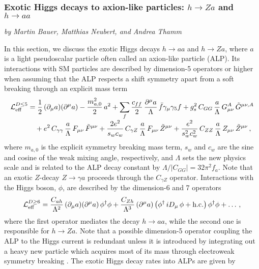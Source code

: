 \subsubsection{Exotic Higgs decays to axion-like particles: $h \to Za$ and $h \to aa$}\label{Sec:9.1.8}
\begin{center}
{\it{ by Martin Bauer, Matthias Neubert, and Andrea Thamm}}
\end{center}


In this section, we discuss the exotic Higgs decays $h\to aa$ and $h\to Za$, where $a$ is a light pseudoscalar particle often called an axion-like particle (ALP). Its interactions with SM particles are described by dimension-5 operators or higher when assuming that the ALP respects a shift symmetry apart from a soft breaking through an explicit mass term \cite{Georgi:1986df} 
%
\begin{equation}\label{Leff}
\begin{aligned}
   {\cal L}_{\rm eff}^{D\le 5}
   &= \frac12 \left( \partial_\mu a\right)\!\left( \partial^\mu a\right)
    - \frac{m_{a,0}^2}{2}\,a^2 
    + \sum_f \frac{c_{ff}}{2}\,\frac{\partial^\mu a}{\Lambda}\,\bar f\gamma_\mu\gamma_5 f  + g_s^2\,C_{GG}\,\frac{a}{\Lambda}\,G_{\mu\nu}^A\,\tilde G^{\mu\nu,A} \\[-1mm]
   &\quad\mbox{}+ e^2\,C_{\gamma\gamma}\,\frac{a}{\Lambda}\,F_{\mu\nu}\,\tilde F^{\mu\nu}
    + \frac{2e^2}{s_w c_w}\,C_{\gamma Z}\,\frac{a}{\Lambda}\,F_{\mu\nu}\,\tilde Z^{\mu\nu}
    + \frac{e^2}{s_w^2 c_w^2}\,C_{ZZ}\,\frac{a}{\Lambda}\,Z_{\mu\nu}\,\tilde Z^{\mu\nu} \,,
\end{aligned}
\end{equation}
%
where $m_{a,0}$ is the explicit symmetry breaking mass term, $s_w$ and $c_w$ are the sine and cosine of the weak mixing angle, respectively, and $\Lambda$ sets the new physics scale and is related to the ALP decay constant by $\Lambda/|C_{GG}| = 32 \pi^2 f_a$. Note that an exotic $Z$-decay $Z\to\gamma a$ proceeds through the $C_{\gamma Z}$ operator.  Interactions with the Higgs boson, $\phi$, are described by the dimension-6 and 7 operators
%
\begin{equation}\label{LeffD>5}
   {\cal L}_{\rm eff}^{D\ge 6}
   = \frac{C_{ah}}{\Lambda^2} \left( \partial_\mu a\right)\!\left( \partial^\mu a\right) \phi^\dagger\phi
    + \frac{C_{Zh}}{\Lambda^3} \left( \partial^\mu a\right) 
    \left( \phi^\dagger\,iD_\mu\,\phi + \mbox{h.c.} \right) \phi^\dagger\phi + \dots  \,,
\end{equation}
%
where the first operator mediates the decay $h\to aa$, while the second one is responsible for $h\to Za$. Note that a possible dimension-5 operator coupling the ALP to the Higgs current is redundant unless it is introduced by integrating out a heavy new particle which acquires most of its mass through electroweak symmetry breaking \cite{Bauer:2016ydr,Bauer:2016zfj,Bauer:2017nlg,Bauer:2017ris}. The exotic Higgs decay rates into ALPs are given by  
